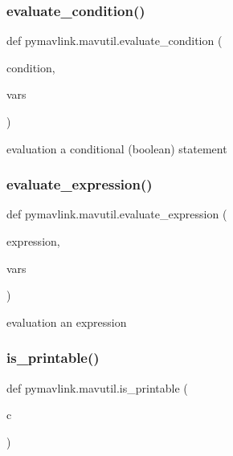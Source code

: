 \subsubsection{\texorpdfstring{evaluate\+\_\+condition()}{evaluate\_condition()}}
{\footnotesize\ttfamily def pymavlink.\+mavutil.\+evaluate\+\_\+condition (\begin{DoxyParamCaption}\item[{}]{condition,  }\item[{}]{vars }\end{DoxyParamCaption})}

\begin{DoxyVerb}evaluation a conditional (boolean) statement\end{DoxyVerb}
 \mbox{\label{namespacepymavlink_1_1mavutil_a59db6edd846450994bc53aabfeafff08}} 
\subsubsection{\texorpdfstring{evaluate\+\_\+expression()}{evaluate\_expression()}}
{\footnotesize\ttfamily def pymavlink.\+mavutil.\+evaluate\+\_\+expression (\begin{DoxyParamCaption}\item[{}]{expression,  }\item[{}]{vars }\end{DoxyParamCaption})}

\begin{DoxyVerb}evaluation an expression\end{DoxyVerb}
 \mbox{\label{namespacepymavlink_1_1mavutil_ae8d15d242baf89755d968c50f6f300b1}} 
\subsubsection{\texorpdfstring{is\+\_\+printable()}{is\_printable()}}
{\footnotesize\ttfamily def pymavlink.\+mavutil.\+is\+\_\+printable (\begin{DoxyParamCaption}\item[{}]{c }\end{DoxyParamCaption})}


